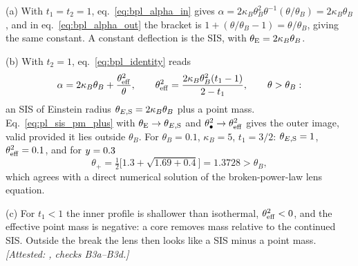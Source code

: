 (a) With $t_1=t_2=1$, eq.~\eqref{eq:bpl_alpha_in} gives
$\alpha=2\kappa_B\theta_B^2\theta^{-1}(\theta/\theta_B)=2\kappa_B\theta_B$,
and in eq.~\eqref{eq:bpl_alpha_out} the bracket is
$1+(\theta/\theta_B-1)=\theta/\theta_B$, giving the same constant.  A
constant deflection is the SIS, with $\theta_{\mathrm{E}}=2\kappa_B\theta_B$.

(b) With $t_2=1$, eq.~\eqref{eq:bpl_identity} reads
\begin{equation*}
    \alpha=2\kappa_B\theta_B+\frac{\theta_{\rm eff}^2}{\theta} ,
    \qquad
    \theta_{\rm eff}^2=\frac{2\kappa_B\theta_B^2(t_1-1)}{2-t_1} ,
    \qquad\theta>\theta_B :
\end{equation*}
an SIS of Einstein radius $\theta_{E,\rm S}=2\kappa_B\theta_B$ plus a
point mass.  Eq.~\eqref{eq:pl_sis_pm_plus} with
$\theta_{\mathrm{E}}\to\theta_{E,\rm S}$ and $\theta_{\bullet}^2\to\theta_{\rm eff}^2$
gives the outer image, valid provided it lies outside $\theta_B$.  For
$\theta_B=0.1$, $\kappa_B=5$, $t_1=3/2$: $\theta_{E,\rm S}=1$,
$\theta_{\rm eff}^2=0.1$, and for $y=0.3$
\begin{equation*}
    \theta_+=\tfrac12\Big[1.3+\sqrt{1.69+0.4}\Big]=1.3728>\theta_B ,
\end{equation*}
which agrees with a direct numerical solution of the broken-power-law
lens equation.

(c) For $t_1<1$ the inner profile is shallower than
isothermal, $\theta_{\rm eff}^2<0$, and the effective point mass is
negative: a core removes mass relative to the continued SIS.
Outside the break the lens then looks like a SIS minus a point mass.
\emph{[Attested: , checks B3a--B3d.]}
